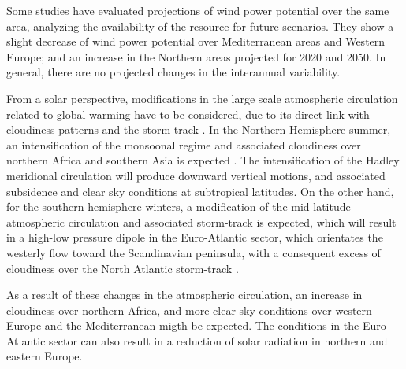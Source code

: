 Some studies have evaluated projections of wind power potential over the same area, analyzing the availability of the resource for future scenarios. They show a slight decrease of wind power potential over Mediterranean areas and Western Europe; and an increase in the Northern areas \cite*{Tobin2015, Tobin2016} projected for 2020 and 2050. In general, there are no projected changes in the interannual variability.

From a solar perspective, modifications in the large scale atmospheric circulation related to global warming have to be considered, due to its direct link with cloudiness patterns and the storm-track \cite{Pozo-Vazquez2004, Chiacchio2010, Chiacchio2012}. In the Northern Hemisphere summer, an intensification of the monsoonal regime and associated cloudiness over northern Africa and southern Asia is expected \cite*{Gaetani2014}. The intensification of the Hadley meridional circulation  will produce downward vertical motions, and associated subsidence and clear sky conditions at subtropical latitudes. On the other hand, for the southern hemisphere winters, a modification of the mid-latitude atmospheric circulation and associated storm-track is expected, which will result in a high-low pressure dipole in the Euro-Atlantic sector, which orientates the westerly flow toward the Scandinavian peninsula, with a consequent excess of cloudiness over the North Atlantic storm-track \cite{Gaetani2014}.

As a result of these changes in the atmospheric circulation, an increase in cloudiness over northern Africa, and more clear sky conditions over western Europe and the Mediterranean \cite*{Gaetani2014} migth be expected. The conditions in the Euro-Atlantic sector can also result in a reduction of solar radiation in northern and eastern Europe.




